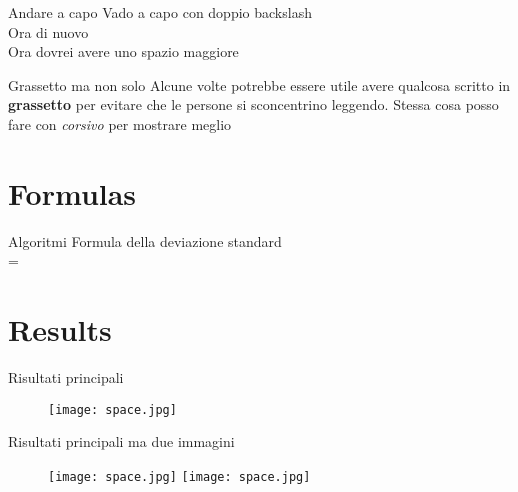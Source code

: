 \documentclass{beamer} %
\begin{document}
\begin{frame}{Andare a capo}
Vado a capo con doppio backslash \\
Ora di nuovo \\
\bigskip 
Ora dovrei avere uno spazio maggiore 
\end{frame}

\begin{frame}{Grassetto ma non solo}
Alcune volte potrebbe essere utile avere qualcosa scritto in \textbf{grassetto} per evitare che le persone si sconcentrino leggendo. Stessa cosa posso fare con \textit{corsivo} per mostrare meglio
\end{frame}

\section{Formulas}
\begin{frame}{Algoritmi} 
Formula della deviazione standard \\
\bigskip
\centering %
    \delta =  
\end{frame}

\section{Results} %
\begin{frame}{Risultati principali} %
    \begin{figure}
        \centering
        \texttt{[image: space.jpg]}
        \label{fig:enter-label}
\end{figure}
\end{frame}

\begin{frame}{Risultati principali ma due immagini} %
    \begin{figure}
        \centering
        \texttt{[image: space.jpg]}
        \texttt{[image: space.jpg]}
\end{figure}
\end{frame}
\end{document}
